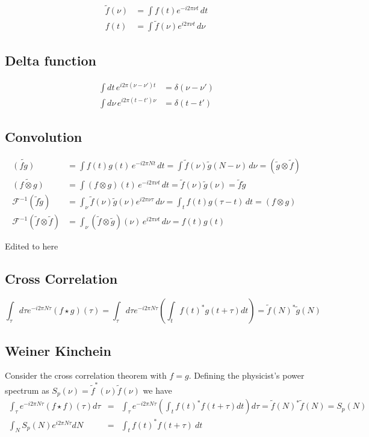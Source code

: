 \documentclass{article}
\begin{document}
\begin{align*}
  \tilde{f}(\nu) &= \int f(t) e^{-i 2 \pi \nu t} \, dt \\
  f(t) &= \int \tilde{f}(\nu) e^{i 2 \pi \nu t} \, d\nu
\end{align*}

\subsection{Delta function}

\begin{align*}
  \int dt \, e^{i 2 \pi(\nu - \nu') t} &= \delta(\nu - \nu') \\
  \int d\nu \, e^{i 2 \pi(t - t') \nu} &= \delta(t - t')
\end{align*}

\subsection{Convolution}
\begin{align*}
  \widetilde{(fg)}
  &= \int f(t) g(t) \, e^{-i 2 \pi N t} \, dt
  =  \int \tilde{f}(\nu) \tilde{g}(N - \nu) \, d\nu
  = (\tilde{g} \otimes \tilde{f}) \\
  \widetilde{(f \otimes g)}
  &= \int (f \otimes g)(t) \, e^{-i 2 \pi \nu t} \, dt
  = \tilde{f}(\nu) \tilde{g}(\nu)
  = \tilde{f} \tilde{g} \\
  \mathcal{F}^{-1}(\tilde{f} \tilde{g})
  &= \int_{\nu} \tilde{f}(\nu) \tilde{g}(\nu) e^{i 2 \pi \nu \tau} \, d\nu
  = \int_{t} f(t) g(\tau - t) \, dt
  = (f \otimes g) \\
  \mathcal{F}^{-1}(\tilde{f} \otimes \tilde{f})
  &= \int_{\nu}(\tilde{f} \otimes \tilde{g})(\nu) \, e^{i 2 \pi \nu t} \, d\nu
  = f(t) g(t)
\end{align*}

Edited to here

\subsection{Cross Correlation}

\begin{equation}
  \int_{\tau} d\tau e^{-i 2 \pi N \tau}
  \left(f \star g\right)(\tau)
  = \int_{\tau} d\tau e^{-i 2 \pi N \tau}
  \left(\int_{t}f(t)^{*}g(t+\tau)dt\right)
  =\tilde{f}(N)^{*}\tilde{g}(N)
\end{equation}

\subsection{Weiner Kinchein}
Consider the cross correlation theorem
with $f=g$.
Defining the physicist's power spectrum as $S_{p}(\nu)=\tilde{f}^{*}(\nu)\tilde{f}(\nu)$
we have
\begin{eqnarray*}
  \int_{\tau}e^{-i2\pi N\tau}(f\star f)(\tau)d\tau & = & \int_{\tau}e^{-i2\pi N\tau}\left(\int_{t}f(t)^{*}f(t+\tau)dt\right)d\tau=\tilde{f}(N)^{*}\tilde{f}(N)=S_{p}(N)\\
  \int_{N}S_{p}(N)e^{i2\pi N\tau}dN & = & \int_{t}f(t)^{*}f(t+\tau)\: dt
  \end{eqnarray*}
\end{document}
